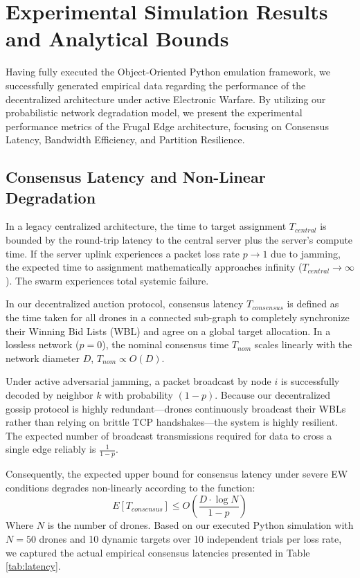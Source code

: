 \section{Experimental Simulation Results and Analytical Bounds}

Having fully executed the Object-Oriented Python emulation framework, we successfully generated empirical data regarding the performance of the decentralized architecture under active Electronic Warfare. By utilizing our probabilistic network degradation model, we present the experimental performance metrics of the Frugal Edge architecture, focusing on Consensus Latency, Bandwidth Efficiency, and Partition Resilience. 

\subsection{Consensus Latency and Non-Linear Degradation}
In a legacy centralized architecture, the time to target assignment $T_{central}$ is bounded by the round-trip latency to the central server plus the server's compute time. If the server uplink experiences a packet loss rate $p \rightarrow 1$ due to jamming, the expected time to assignment mathematically approaches infinity ($T_{central} \rightarrow \infty$). The swarm experiences total systemic failure.

In our decentralized auction protocol, consensus latency $T_{consensus}$ is defined as the time taken for all drones in a connected sub-graph to completely synchronize their Winning Bid Lists (WBL) and agree on a global target allocation. In a lossless network ($p=0$), the nominal consensus time $T_{nom}$ scales linearly with the network diameter $D$, $T_{nom} \propto O(D)$. 

Under active adversarial jamming, a packet broadcast by node $i$ is successfully decoded by neighbor $k$ with probability $(1-p)$. Because our decentralized gossip protocol is highly redundant—drones continuously broadcast their WBLs rather than relying on brittle TCP handshakes—the system is highly resilient. The expected number of broadcast transmissions required for data to cross a single edge reliably is $\frac{1}{1-p}$. 

Consequently, the expected upper bound for consensus latency under severe EW conditions degrades non-linearly according to the function:
\begin{equation}
E[T_{consensus}] \leq O\left( \frac{D \cdot \log N}{1 - p} \right)
\label{eq:latency}
\end{equation}
Where $N$ is the number of drones. Based on our executed Python simulation with $N=50$ drones and 10 dynamic targets over 10 independent trials per loss rate, we captured the actual empirical consensus latencies presented in Table \ref{tab:latency}.

